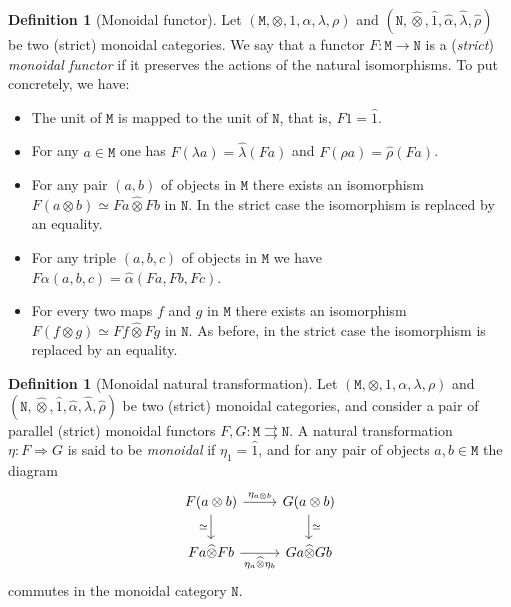 \documentclass[11pt, reqno]{amsart}
\theoremstyle{definition}
\newtheorem{definition}[theorem]{Definition}
\newcommand{\iso}{\simeq}
\newcommand{\dis}{\iso}
\newcommand{\nat}{\Rightarrow}
\newcommand{\para}{\rightrightarrows}
\newcommand{\cat}{\texttt}
\begin{document}
\begin{definition}[Monoidal functor]
\label{def:monoidal-functor}
Let \((\cat M, \otimes, 1, \alpha, \lambda, \rho)\) and \((\cat N,
\widehat\otimes, \widehat 1, \widehat \alpha, \widehat \lambda, \widehat \rho)\)
be two (strict) monoidal categories. We say that a functor \(F: \cat M \to \cat
N\) is a (\emph{strict}) \emph{monoidal functor} if it preserves the actions of
the natural isomorphisms. To put concretely, we have:
\begin{itemize}\setlength\itemsep{0em}
\item The unit of \(\cat M\) is mapped to the unit of \(\cat N\), that is,
  \(F 1 = \widehat 1\).

\item For any \(a \in \cat M\) one has
  \(F (\lambda a) = \widehat \lambda (F a)\) and
  \(F (\rho a) = \widehat \rho(F a)\).

\item For any pair \((a, b)\) of objects in \(\cat M\) there exists an
  isomorphism \(F(a \otimes b) \iso F a \widehat \otimes F b\) in \(\cat
  N\). In the strict case the isomorphism is replaced by an equality.

\item For any triple \((a, b, c)\) of objects in \(\cat M\) we have
  \(F \alpha(a, b, c) = \widehat \alpha (F a, F b, F c)\).

\item For every two maps \(f\) and \(g\) in \(\cat M\) there exists an
  isomorphism \(F(f \otimes g) \iso F f \widehat \otimes F g\) in \(\cat N\). As
  before, in the strict case the isomorphism is replaced by an equality.
\end{itemize}
\end{definition}

\begin{definition}[Monoidal natural transformation]
\label{def:monoidal-natural-transformation}
Let \((\cat M, \otimes, 1, \alpha, \lambda, \rho)\) and
\((\cat N, \widehat\otimes, \widehat 1, \widehat \alpha, \widehat \lambda,
\widehat \rho)\) be two (strict) monoidal categories, and consider a pair of
parallel (strict) monoidal functors \(F, G: \cat M \para \cat N\). A natural
transformation \(\eta: F \nat G\) is said to be \emph{monoidal} if
\(\eta_1 = \widehat 1\), and for any pair of objects \(a, b \in \cat M\) the
diagram
\[
\begin{tikzcd}
F(a \otimes b) \ar[d, "\dis"']
\ar[r, "\eta_{a \otimes b}"]
&G(a \otimes b) \ar[d, "\dis"] \\
F a \widehat\otimes F b \ar[r, "\eta_a \widehat\otimes \eta_b"']
&G a \widehat\otimes G b
\end{tikzcd}
\]
commutes in the monoidal category \(\cat N\).
\end{definition}
\end{document}
